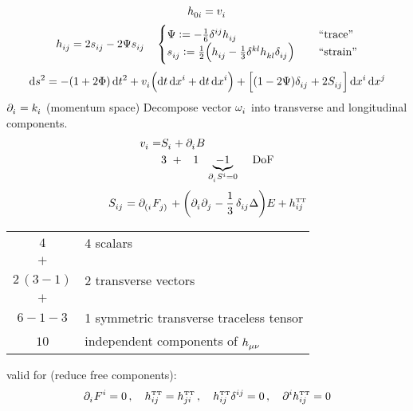 \begin{equation}
	\tensor{h}{_{0i}} = \tensor{v}{_i}
\end{equation}
\begin{equation}
	\tensor{h}{_{ij}} = 2\tensor{s}{_{ij}} - 2\Psi\tensor{s}{_{ij}}\,\quad
	\begin{cases}
		\Psi := -\frac{1}{6}\tensor{\delta}{^{ij}}\tensor{h}{_{ij}}\,\quad
		&\text{``trace''} \\
		\tensor{s}{_{ij}} := \frac{1}{2} \left(\tensor{h}{_{ij}} - \frac{1}{3}\tensor{\delta}{^{kl}}\tensor{h}{_{kl}}\tensor{\delta}{_{ij}}\right)\,\quad &\text{``strain''}
	\end{cases}
\end{equation}
\begin{equation}
	\dif s^2 = -\left(1+2\Phi\right)\dif t^2 + \tensor{v}{_i} \left(\dif t \dif \tensor{x}{^i} + \dif t \dif \tensor{x}{^i}\right) + \left[\left(1-2\Psi\right)\tensor{\delta}{_{ij}} + 2 \tensor{S}{_{ij}} \right]\dif \tensor{x}{^i}\dif \tensor{x}{^j}
\end{equation}
$\tensor{\partial}{_i} = \tensor{k}{_i}$ (momentum space)
Decompose vector $\tensor{\omega}{_i}$ into transverse and longitudinal components.
\begin{align}
	\tensor{v}{_i} = &\tensor{S}{_i} + \tensor{\partial}{_i}B\\
	&3\,\,+\,\,\,\,\,1\,\,\,\,\underbrace{-1}_{\tensor{\partial}{_i}\tensor{S}{^i}=0}\,\quad \text{DoF}
\end{align}
\begin{equation}
	\tensor{S}{_{ij}} = \tensor{\partial}{_{(i}}\tensor{F}{_{j)}} + \left( \tensor{\partial}{_i}\tensor{\partial}{_j} - \frac{1}{3}\,\tensor{\delta}{_{ij}}\Delta\right) E + \tensor*{h}{_{ij}^{\text{\tiny TT}}}
\end{equation}
\begin{center}
\begin{tabular}{c l}
$4$ & 4 scalars \\
$+$ & \\
$2\,(3-1)$ & 2 transverse vectors \\
$+$ & \\
$6-1-3$ & 1 symmetric transverse traceless tensor \\
\midrule
$10$ & independent components of $\tensor{h}{_{\mu\nu}}$
\end{tabular}
\end{center}
valid for (reduce free components):
\begin{equation}
\tensor{\partial}{_i}\tensor{F}{^i}=0\,,\quad\tensor*{h}{_{ij}^{\text{\tiny TT}}}=\tensor*{h}{_{ji}^{\text{\tiny TT}}}\,,\quad\tensor*{h}{_{ij}^{\text{\tiny TT}}}\tensor{\delta}{^{ij}}=0\,,\quad\tensor{\partial}{^i}\tensor*{h}{_{ij}^{\text{\tiny TT}}}=0
\end{equation}
